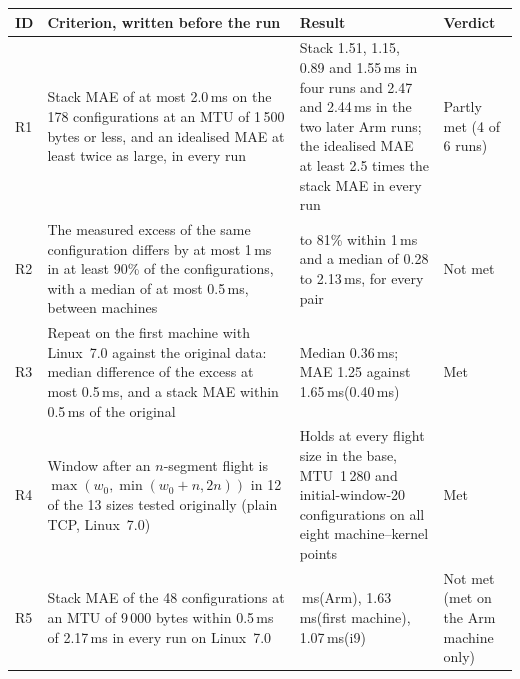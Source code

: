 \documentclass[preprint,12pt]{elsarticle}
\newcommand{\ms}{\,ms\xspace}
\begin{document}
\begin{center}\begin{minipage}{\textwidth}\footnotesize\captionsetup{justification=raggedright,singlelinecheck=off}
\label{tab:prereg_repl}
\renewcommand{\arraystretch}{1.12}
\begin{tabularx}{\textwidth}{@{}>{\raggedright\arraybackslash}p{}>{\raggedright\arraybackslash}X>{\raggedright\arraybackslash}X>{\raggedright\arraybackslash}p{}@{}}
\toprule
ID & Criterion, written before the run & Result & Verdict \\
\midrule
R1 & Stack MAE of at most 2.0\ms on the 178 configurations at an MTU of 1\,500 bytes or less, and an idealised MAE at least twice as large, in every run & Stack 1.51, 1.15, 0.89 and 1.55\ms in four runs and 2.47 and 2.44\ms in the two later Arm runs; the idealised MAE at least 2.5 times the stack MAE in every run & Partly met (4 of 6 runs) \\
R2 & The measured excess of the same configuration differs by at most 1\ms in at least 90\% of the configurations, with a median of at most 0.5\ms, between machines & 11 to 81\% within 1\ms and a median of 0.28 to 2.13\ms, for every pair & Not met \\
R3 & Repeat on the first machine with Linux~7.0 against the original data: median difference of the excess at most 0.5\ms, and a stack MAE within 0.5\ms of the original & Median 0.36\ms; MAE 1.25 against 1.65\ms (0.40\ms) & Met \\
R4 & Window after an $n$-segment flight is $\max(w_0,\min(w_0+n,2n))$ in 12 of the 13 sizes tested originally (plain TCP, Linux~7.0) & Holds at every flight size in the base, MTU~1\,280 and initial-window-20 configurations on all eight machine--kernel points & Met \\
R5 & Stack MAE of the 48 configurations at an MTU of 9\,000 bytes within 0.5\ms of 2.17\ms in every run on Linux~7.0 & 2.01\ms (Arm), 1.63\ms (first machine), 1.07\ms (i9) & Not met (met on the Arm machine only) \\
\bottomrule
\end{tabularx}
\end{minipage}\end{center}
\end{document}
